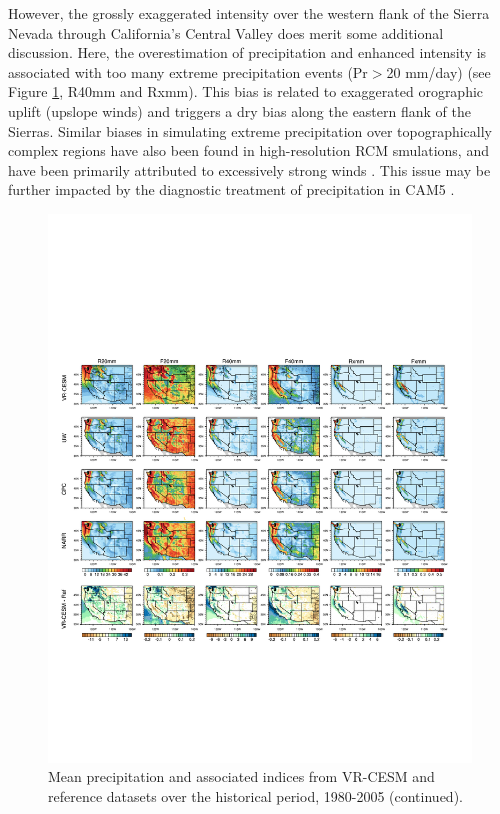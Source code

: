 However, the grossly exaggerated intensity over the western flank of the Sierra Nevada through California's Central Valley does merit some additional discussion.  Here, the overestimation of precipitation and enhanced intensity is associated with too many extreme precipitation events (Pr$>$20 mm/day) (see Figure \ref{fig:histEval3}, R40mm and Rxmm).  This bias is related to exaggerated orographic uplift (upslope winds) and triggers a dry bias along the eastern flank of the Sierras.  Similar biases in simulating extreme precipitation over topographically complex regions have also been found in high-resolution RCM smulations, and have been primarily attributed to excessively strong winds \cite{walker2009evaluation, singh2013precipitation}.  This issue may be further impacted by the diagnostic treatment of precipitation in CAM5 \cite{morrison2008new, gettelman2008new}.

\begin{figure}
\begin{center}
\includegraphics[width=6in, trim={0.6cm 4.5cm 1.2cm 4.9cm},clip]{wd_index_Hist_ref_annual_part3.pdf}
\caption{Mean precipitation and associated indices from VR-CESM and reference datasets over the historical period, 1980-2005 (continued).}
\label{fig:histEval3}
\end{center}
\end{figure}

